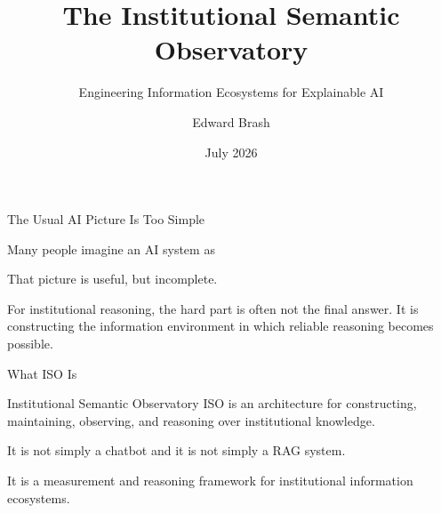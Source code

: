 \documentclass[aspectratio=169]{beamer}
\title{The Institutional Semantic Observatory}
\subtitle{Engineering Information Ecosystems for Explainable AI}
\author{Edward Brash}
\institute{
School of Engineering and Computing\\
Christopher Newport University
}
\date{July 2026}
\newcommand{\ISO}{\textsc{ISO}}
\begin{document}
\begin{frame}
    \titlepage
\end{frame}

\begin{frame}{The Usual AI Picture Is Too Simple}

\Large

Many people imagine an AI system as

\vspace{0.5cm}

\begin{center}
\end{center}

\vspace{0.6cm}

That picture is useful, but incomplete.

\vspace{0.4cm}

For institutional reasoning, the hard part is often not the final answer.
It is constructing the information environment in which reliable reasoning becomes possible.

\end{frame}

\begin{frame}{What ISO Is}

\Large

\begin{block}{Institutional Semantic Observatory}
\ISO{} is an architecture for constructing, maintaining, observing, and reasoning over institutional knowledge.
\end{block}

\vspace{0.6cm}

It is not simply a chatbot and it is not simply a RAG system.

\vspace{0.4cm}

It is a measurement and reasoning framework for institutional information ecosystems.

\end{frame}
\end{document}
